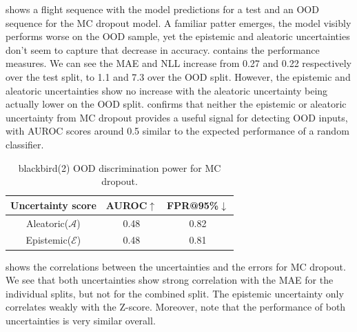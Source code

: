  shows a flight sequence with the model predictions for a test and an OOD sequence for the MC dropout model. A familiar patter emerges, the model visibly performs worse on the OOD sample, yet the epistemic and aleatoric uncertainties don't seem to capture that decrease in accuracy.  contains the performance measures. We can see the MAE and NLL increase from 0.27 and 0.22 respectively over the test split, to 1.1 and 7.3 over the OOD split. However, the epistemic and aleatoric uncertainties show no increase with the aleatoric uncertainty being actually lower on the OOD split.  confirms that neither the epistemic or aleatoric uncertainty from MC dropout provides a useful signal for detecting OOD inputs, with AUROC scores around 0.5 similar to the expected performance of a random classifier. 


\begin{table}[h]
\centering
    \begin{tabular}{c  c  c}  
        \toprule
        Uncertainty score & AUROC$\uparrow$ & FPR@95\%$\downarrow$\\
        \midrule
        Aleatoric($\mathcal{A}$) & 0.48  & 0.82\\
        Epistemic($\mathcal{E}$) & 0.48 &  0.81 \\
        \midrule
    \end{tabular}
    \caption{blackbird(2) OOD discrimination power for MC dropout.}
    \label{tbl:bb2_dropout_discrimination}
\end{table}

 shows the correlations between the uncertainties and the errors for MC dropout. We see that both uncertainties show strong correlation with the MAE for the individual splits, but not for the combined split. The epistemic uncertainty only correlates weakly with the Z-score. Moreover, note that the performance of both uncertainties is very similar overall. 


